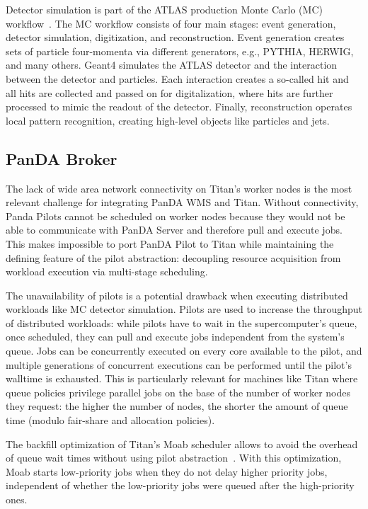 Detector simulation is part of the ATLAS production Monte Carlo (MC)
workflow~\cite{rimoldi2006atlas}. The MC workflow consists of four main
stages: event generation, detector simulation, digitization, and
reconstruction. Event generation creates sets of particle four-momenta via
different generators, e.g., PYTHIA, HERWIG, and many others. Geant4 simulates
the ATLAS detector and the interaction between the detector and particles.
Each interaction creates a so-called hit and all hits are collected and
passed on for digitalization, where hits are further processed to mimic the
readout of the detector. Finally, reconstruction operates local pattern
recognition, creating high-level objects like particles and jets.

\subsection{PanDA Broker}\label{ssec:panda_titan}

The lack of wide area network connectivity on Titan's worker nodes is the
most relevant challenge for integrating PanDA WMS and Titan. Without
connectivity, Panda Pilots cannot be scheduled on worker nodes because they
would not be able to communicate with PanDA Server and therefore pull and
execute jobs. This makes impossible to port PanDA Pilot to Titan while
maintaining the defining feature of the pilot abstraction: decoupling
resource acquisition from workload execution via multi-stage scheduling.

The unavailability of pilots is a potential drawback when executing
distributed workloads like MC detector simulation. Pilots are used to
increase the throughput of distributed workloads: while pilots have to wait
in the supercomputer's queue, once scheduled, they can pull and execute jobs
independent from the system's queue. Jobs can be concurrently executed on
every core available to the pilot, and multiple generations of concurrent
executions can be performed until the pilot's walltime is exhausted. This is
particularly relevant for machines like Titan where queue policies privilege
parallel jobs on the base of the number of worker nodes they request: the
higher the number of nodes, the shorter the amount of queue time (modulo
fair-share and allocation policies).

The backfill optimization of Titan's Moab scheduler allows to avoid the
overhead of queue wait times without using pilot
abstraction~\cite{maui_backfill_url}. With this optimization, Moab starts
low-priority jobs when they do not delay higher priority jobs, independent of
whether the low-priority jobs were queued after the high-priority ones.

